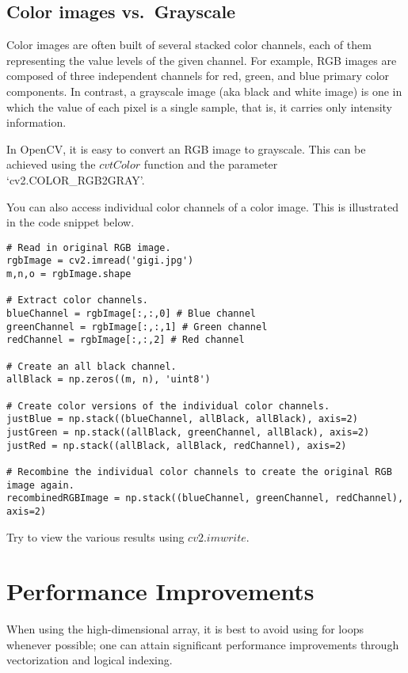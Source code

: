 \documentclass{article}
\begin{document}
\subsection{Color images vs.~Grayscale}

Color images are often built of several stacked color channels, each of them representing the value levels of the given channel. For example, RGB images are composed of three independent channels for red, green, and blue primary color components. In contrast, a grayscale image (aka black and white image) is one in which the value of each pixel is a single sample, that is, it carries only intensity information. 

In OpenCV, it is easy to convert an RGB image to grayscale. This can be achieved using the \href{https://docs.opencv.org/3.4/d8/d01/group__imgproc__color__conversions.html#ga397ae87e1288a81d2363b61574eb8cab}{$cvtColor$} function and the parameter `cv2.COLOR\_RGB2GRAY'.

You can also access individual color channels of a color image. This is illustrated in the code snippet below.



\begin{lstlisting}
# Read in original RGB image.
rgbImage = cv2.imread('gigi.jpg')
m,n,o = rgbImage.shape

# Extract color channels.
blueChannel = rgbImage[:,:,0] # Blue channel
greenChannel = rgbImage[:,:,1] # Green channel
redChannel = rgbImage[:,:,2] # Red channel

# Create an all black channel.
allBlack = np.zeros((m, n), 'uint8')

# Create color versions of the individual color channels.
justBlue = np.stack((blueChannel, allBlack, allBlack), axis=2)
justGreen = np.stack((allBlack, greenChannel, allBlack), axis=2)
justRed = np.stack((allBlack, allBlack, redChannel), axis=2)

# Recombine the individual color channels to create the original RGB image again.
recombinedRGBImage = np.stack((blueChannel, greenChannel, redChannel), axis=2)
\end{lstlisting}

Try to view the various results using \href{https://docs.opencv.org/4.5.2/d4/da8/group__imgcodecs.html#gabbc7ef1aa2edfaa87772f1202d67e0ce}{$cv2.imwrite$}.


\section{Performance Improvements}
When using the high-dimensional array, it is best to avoid using for loops whenever possible; one can attain significant performance improvements through vectorization and logical indexing.
\end{document}
